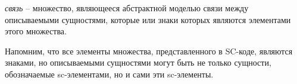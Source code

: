 	


\textit{связь} -- множество, являющееся абстрактной моделью связи между описываемыми сущностями, которые или знаки которых являются элементами этого множества.
	
Напомним, что все элементы множества, представленного в SC-коде, являются знаками, но описываемыми сущностями могут быть не только сущности, обозначаемые sc-элементами, но и сами эти sc-элементы.
	


\begin{scnsubdividing}
\end{scnsubdividing}

\begin{scnsubdividing}
\end{scnsubdividing}
	
